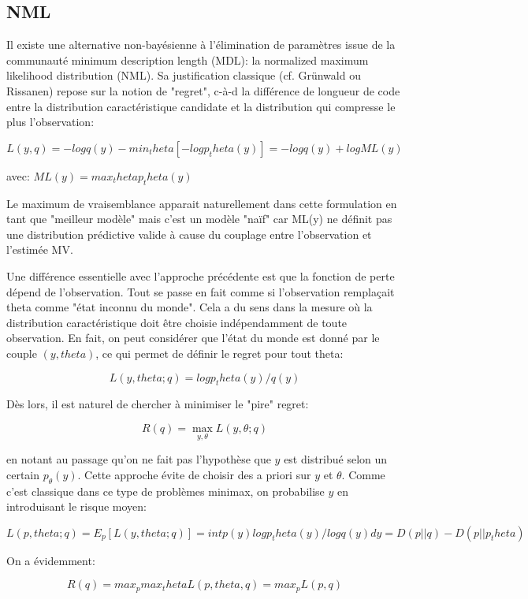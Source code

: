 \documentclass{article}
\begin{document}
\subsection{NML}

Il existe une alternative non-bay\'esienne \`a l'\'elimination de param\`etres issue de la communaut\'e minimum description length (MDL): la normalized maximum likelihood distribution (NML). Sa justification classique (cf. Gr\"unwald ou Rissanen) repose sur la notion de "regret", c-\`a-d la diff\'erence de longueur de code entre la distribution caract\'eristique candidate et la distribution qui compresse le plus l'observation: 

$$L(y, q) = - log q(y) - min_theta [-log p_theta(y)] = -log q(y) + log ML(y)$$ 

avec: $ML(y) = max_theta p_theta(y)$ 

Le maximum de vraisemblance apparait naturellement dans cette formulation en tant que "meilleur mod\`ele" mais c'est un mod\`ele "na\"if" car ML(y) ne d\'efinit pas une distribution pr\'edictive valide \`a cause du couplage entre l'observation et l'estim\'ee MV. 

Une diff\'erence essentielle avec l'approche pr\'ec\'edente est que la fonction de perte d\'epend de l'observation. Tout se passe en fait comme si l'observation rempla\c{c}ait theta comme "\'etat inconnu du monde". Cela a du sens dans la mesure o\`u la distribution caract\'eristique doit \^etre choisie ind\'ependamment de toute observation. En fait, on peut consid\'erer que l'\'etat du monde est donn\'e par le couple $(y, theta)$, ce qui permet de d\'efinir le regret pour tout theta: 

$$L(y, theta; q) = log p_theta(y) / q(y)$$ 

D\`es lors, il est naturel de chercher \`a minimiser le "pire" regret: 

$$R(q) = \max_{y, \theta} L(y, \theta; q)$$ 

en notant au passage qu'on ne fait pas l'hypoth\`ese que $y$ est distribu\'e selon un certain $p_\theta(y)$. Cette approche \'evite de choisir des a priori sur $y$ et $\theta$. Comme c'est classique dans ce type de probl\`emes minimax, on probabilise $y$ en introduisant le risque moyen: 

$$L(p, theta; q) = E_p [L(y, theta; q)] = int p(y) log p_theta(y) / log q(y) dy = D(p||q) - D(p||p_theta) $$ 

On a \'evidemment: 

$$R(q) = max_p max_theta L(p, theta, q) = max_p L(p, q)$$ 
\end{document}
